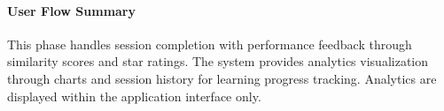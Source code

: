 \clearpage

\paragraph{User Flow Summary}
This phase handles session completion with performance feedback through similarity scores and star ratings. The system provides analytics visualization through charts and session history for learning progress tracking. Analytics are displayed within the application interface only.